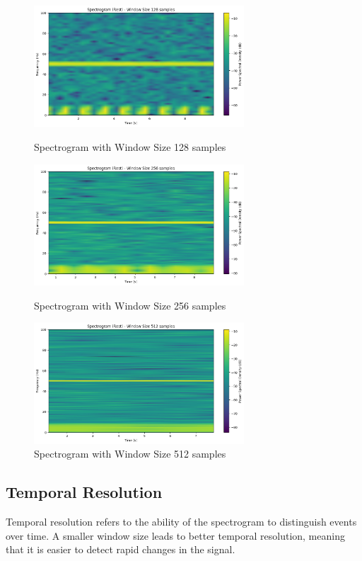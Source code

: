 \documentclass[10pt]{article}
\theoremstyle{definition}
\theoremstyle{remark}
\theoremstyle{definition}
\numberwithin{equation}{prob}
\begin{document}
\begin{figure}[H]
    \centering
    \includegraphics[width=0.7\textwidth]{./figures/Spectrogram Rest Window Size 128 samples.png}
    \caption{Spectrogram with Window Size 128 samples}
    
    \includegraphics[width=0.7\textwidth]{./figures/Spectrogram Rest Window Size 256 samples.png}
    \caption{Spectrogram with Window Size 256 samples}
    
    \includegraphics[width=0.7\textwidth]{./figures/Spectrogram Rest Window Size 512 samples.png}
    \caption{Spectrogram with Window Size 512 samples}
    
    \label{fig:spectrograms}
\end{figure}

\subsection{Temporal Resolution}
Temporal resolution refers to the ability of the spectrogram to distinguish events over time. A smaller window size leads to better temporal resolution, meaning that it is easier to detect rapid changes in the signal.
\end{document}
